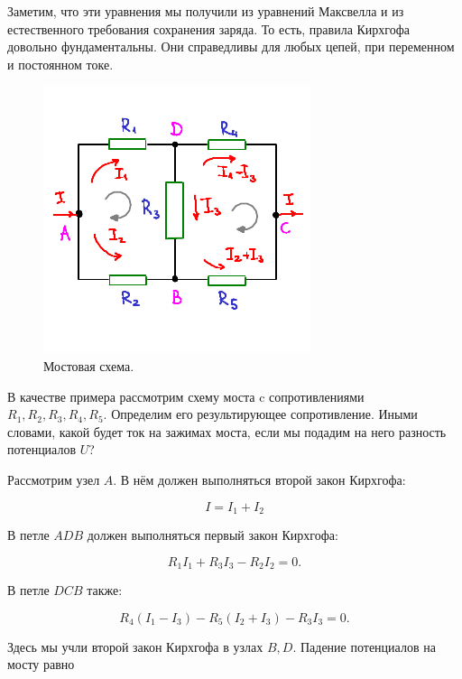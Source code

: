 \documentclass[12pt,a4paper]{article}
\numberwithin{equation}{section}
\numberwithin{equation}{section}
\begin{document}
Заметим, что эти уравнения мы получили из уравнений Максвелла и из
естественного требования сохранения заряда. То есть, правила Кирхгофа
довольно фундаментальны. Они справедливы для любых цепей, при
переменном и постоянном токе. 

\begin{figure}[h]
  \centering
  \includegraphics[scale=1.5]{bridge}
  \vspace{-1cm}
  \caption{Мостовая схема.}
  \label{fig:bridge}
\end{figure}

В качестве примера рассмотрим схему моста c сопротивлениями $R_1, R_2,
R_3, R_4, R_5$. Определим его результирующее сопротивление. Иными
словами, какой будет ток на зажимах моста, если мы подадим на него
разность потенциалов $U$?

Рассмотрим узел $A$. В нём должен выполняться второй закон
Кирхгофа:

\begin{equation}
  \label{eq:apply_kirchoff_0}
  I = I_1 + I_2
\end{equation}

В петле $ADB$ должен выполняться первый закон Кирхгофа:

\begin{equation}
  \label{eq:apply_kirchoff_1}
  R_1 I_1 + R_3 I_3 -R_2 I_2 = 0.
\end{equation}

В петле $DCB$ также:

\begin{equation}
  \label{eq:apply_kirchoff_2}
  R_4 (I_1 - I_3) - R_5 (I_2 + I_3) -R_3 I_3 =0.
\end{equation}

Здесь мы учли второй закон Кирхгофа в узлах $B,D$. Падение потенциалов на
мосту равно 
\end{document}
